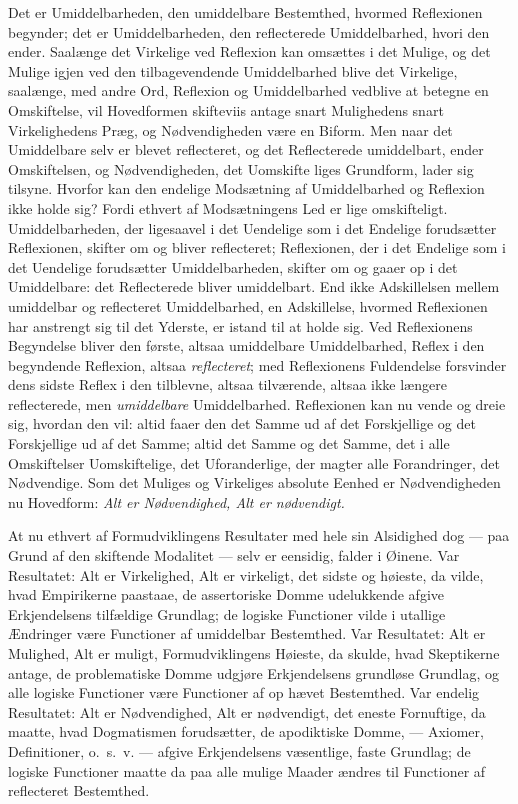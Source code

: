 \documentclass[12pt]{book}
\newcommand{\opage}[1]{\marginnote{\footnotesize\textit{[#1]}}}
\begin{document}
Det er Umiddelbarheden, den umiddelbare Bestemthed,
hvormed Reflexionen begynder; det er Umiddelbarheden, den
reflecterede Umiddelbarhed, hvori den ender. Saalænge det
Virkelige ved Reflexion kan omsættes i det Mulige, og det
Mulige igjen ved den tilbagevendende Umiddelbarhed blive det
Virkelige, saalænge, med andre Ord, Reflexion og Umiddelbarhed
vedblive at betegne en Omskiftelse, vil Hovedformen
skifteviis antage snart Mulighedens snart Virkelighedens Præg,
og Nødvendigheden være en Biform. Men naar det Umiddelbare
selv er blevet reflecteret, og det Reflecterede umiddelbart,
ender Omskiftelsen, og Nødvendigheden, det Uomskifte%
\opage{252}liges Grundform, lader sig tilsyne. Hvorfor kan den endelige
Modsætning af Umiddelbarhed og Reflexion ikke holde sig?
Fordi ethvert af Modsætningens Led er lige omskifteligt.
Umiddelbarheden, der ligesaavel i det Uendelige som i det
Endelige forudsætter Reflexionen, skifter om og bliver reflecteret;
Reflexionen, der i det Endelige som i det Uendelige forudsætter
Umiddelbarheden, skifter om og gaaer op i det Umiddelbare: det
Reflecterede bliver umiddelbart. End ikke Adskillelsen mellem
umiddelbar og reflecteret Umiddelbarhed, en Adskillelse, hvormed
Reflexionen har anstrengt sig til det Yderste, er istand
til at holde sig. Ved Reflexionens Begyndelse bliver den
første, altsaa umiddelbare Umiddelbarhed, Reflex i den begyndende
Reflexion, altsaa \emph{reflecteret}; med Reflexionens
Fuldendelse forsvinder dens sidste Reflex i den tilblevne, altsaa
tilværende, altsaa ikke længere reflecterede, men \emph{umiddelbare}
Umiddelbarhed. Reflexionen kan nu vende og dreie sig, hvordan
den vil: altid faaer den det Samme ud af det Forskjellige
og det Forskjellige ud af det Samme; altid det
Samme og det Samme, det i alle Omskiftelser Uomskiftelige,
det Uforanderlige, der magter alle Forandringer, det Nødvendige.
Som det Muliges og Virkeliges absolute Eenhed
er Nødvendigheden nu Hovedform: \emph{Alt er Nødvendighed,
Alt er nødvendigt.}

At nu ethvert af Formudviklingens Resultater med hele
sin Alsidighed dog --- paa Grund af den skiftende Modalitet ---
selv er eensidig, falder i Øinene. Var Resultatet: Alt er
Virkelighed, Alt er virkeligt, det sidste og høieste, da vilde,
hvad Empirikerne paastaae, de assertoriske Domme udelukkende
afgive Erkjendelsens tilfældige Grundlag; de logiske Functioner
vilde i utallige Ændringer være Functioner af umiddelbar
Bestemthed. Var Resultatet: Alt er Mulighed, Alt er muligt,
Formudviklingens Høieste, da skulde, hvad Skeptikerne antage,
de problematiske Domme udgjøre Erkjendelsens grundløse
Grundlag, og alle logiske Functioner være Functioner af op%
\opage{253}hævet Bestemthed. Var endelig Resultatet: Alt er Nødvendighed,
Alt er nødvendigt, det eneste Fornuftige, da maatte,
hvad Dogmatismen forudsætter, de apodiktiske Domme,
--- Axiomer, Definitioner, o.\ s.\ v. --- afgive Erkjendelsens
væsentlige, faste Grundlag; de logiske Functioner maatte da
paa alle mulige Maader ændres til Functioner af reflecteret
Bestemthed.
\end{document}
